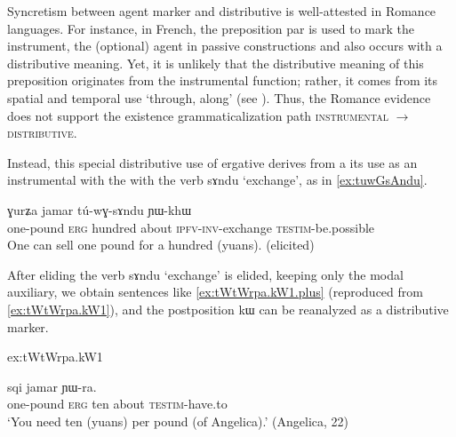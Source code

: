 \documentclass[oldfontcommands,oneside,a4paper,11pt]{article}
\newcommand{\ipa}[1]{{\phon #1}} %
\begin{document}
Syncretism between agent marker and distributive is well-attested in Romance languages. For instance, in French, the preposition  \ipa{par}  is used to mark the instrument, the (optional) agent in passive constructions and also occurs with a distributive meaning. Yet, it is unlikely that the distributive meaning of this preposition originates from the instrumental function; rather, it comes from its  spatial and temporal use `through, along' (see \citealt[213]{wartburg58few8}). 
Thus, the Romance evidence does not support the existence grammaticalization path \textsc{instrumental} $\rightarrow$ \textsc{distributive}.

  Instead, this special distributive use of ergative derives from a its use as an instrumental with the with the verb \ipa{sɤndu} `exchange', as in \ref{ex:tuwGsAndu}.

  \begin{exe}
\ex \label{ex:tuwGsAndu}
\gll 
[\ipa{tɯ-tɯrpa}]  	\ipa{kɯ}  	\ipa{ɣurʑa}  	\ipa{jamar}  	\ipa{tú-wɣ-sɤndu }  	\ipa{ɲɯ-khɯ}  \\
one-pound \textsc{erg} hundred about \textsc{ipfv-inv}-exchange \textsc{testim}-be.possible \\
\glt One can sell one pound for a hundred (yuans). (elicited)
\end{exe}

After eliding the  verb \ipa{sɤndu} `exchange' is elided, keeping only the modal auxiliary, we obtain sentences like \ref{ex:tWtWrpa.kW1.plus} (reproduced from \ref{ex:tWtWrpa.kW1}), and the  postposition \ipa{kɯ} can be reanalyzed as a distributive marker.

{ex:tWtWrpa.kW1}

 \begin{exe} 
\ex \label{ex:tWtWrpa.kW1.plus}
\gll  
[\ipa{tɯ-tɯrpa}] 	\ipa{\textbf{kɯ}} 	\ipa{sqi} 	\ipa{jamar} 	\ipa{ɲɯ-ra.} 	\\
one-pound \textsc{erg} ten about \textsc{testim}-have.to \\
\glt `You need ten (yuans) per pound (of Angelica).' (Angelica, 22)
\end{exe}  

  
\end{document}
